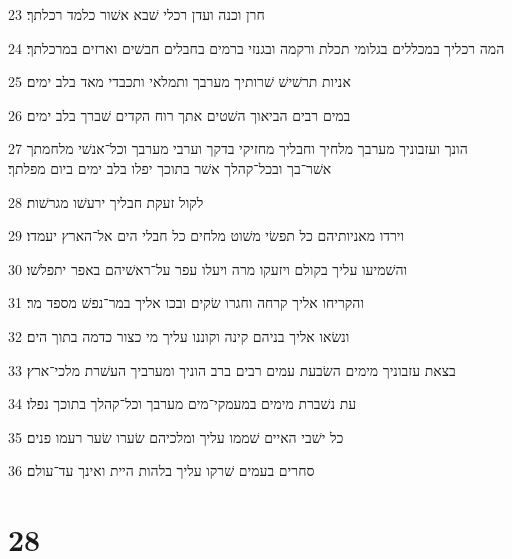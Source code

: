 \par 23 חרן וכנה ועדן רכלי שׁבא אשׁור כלמד רכלתך׃
\par 24 המה רכליך במכללים בגלומי תכלת ורקמה ובגנזי ברמים בחבלים חבשׁים וארזים במרכלתך׃
\par 25 אניות תרשׁישׁ שׁרותיך מערבך ותמלאי ותכבדי מאד בלב ימים׃
\par 26 במים רבים הביאוך השׁטים אתך רוח הקדים שׁברך בלב ימים׃
\par 27 הונך ועזבוניך מערבך מלחיך וחבליך מחזיקי בדקך וערבי מערבך וכל־אנשׁי מלחמתך אשׁר־בך ובכל־קהלך אשׁר בתוכך יפלו בלב ימים ביום מפלתך׃
\par 28 לקול זעקת חבליך ירעשׁו מגרשׁות׃
\par 29 וירדו מאניותיהם כל תפשׂי משׁוט מלחים כל חבלי הים אל־הארץ יעמדו׃
\par 30 והשׁמיעו עליך בקולם ויזעקו מרה ויעלו עפר על־ראשׁיהם באפר יתפלשׁו׃
\par 31 והקריחו אליך קרחה וחגרו שׂקים ובכו אליך במר־נפשׁ מספד מר׃
\par 32 ונשׂאו אליך בניהם קינה וקוננו עליך מי כצור כדמה בתוך הים׃
\par 33 בצאת עזבוניך מימים השׂבעת עמים רבים ברב הוניך ומערביך העשׁרת מלכי־ארץ׃
\par 34 עת נשׁברת מימים במעמקי־מים מערבך וכל־קהלך בתוכך נפלו׃
\par 35 כל ישׁבי האיים שׁממו עליך ומלכיהם שׂערו שׂער רעמו פנים׃
\par 36 סחרים בעמים שׁרקו עליך בלהות היית ואינך עד־עולם׃

\chapter{28}

